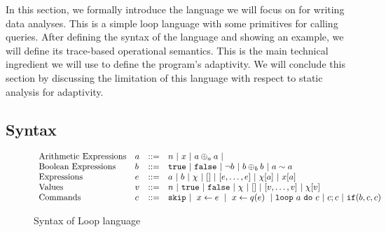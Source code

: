 In this section, we formally introduce the language we will focus on for writing data analyses.  This is a simple loop language with some primitives for calling queries. After defining the syntax of the language and showing an example, we will define its trace-based operational semantics. This is the main technical ingredient we will use to define the program's adaptivity. We will conclude this section by discussing the limitation of this language with respect to static analysis for adaptivity.

\subsection{Syntax}
\label{subsec:loop-syntax}
{\small
\begin{figure}
\[
\begin{array}{llll}
\mbox{Arithmetic Expressions} & \aexpr & ::= & 
	n ~|~ x ~|~ \aexpr \oplus_a \aexpr ~|~ \\
\mbox{Boolean Expressions} & \bexpr & ::= & 
	\etrue ~|~ \efalse  ~|~ \neg \bexpr
	 ~|~ \bexpr \oplus_b \bexpr
	~|~ \aexpr \sim \aexpr \\
\mbox{Expressions } & \expr & ::= & \aexpr \sep \bexpr \sep \chi\sep [] ~|~ [\expr, \dots, \expr] ~|~ \chi[\aexpr] ~|~ x[\aexpr]\\
\mbox{Values } & v & ::= & n \sep \etrue \sep \efalse \sep \chi \sep [] ~|~ [v, \dots, v] ~|~ \chi[v] \\
\mbox{Commands} & c & ::= &  \eskip  ~|~  \assign x \expr ~|~  \assign{x}{ q(e)}
%
~|~ \eloop ~ \aexpr  ~ \edo ~ c  ~|~ c;c  ~|~ \eif(\bexpr, c, c) 	 
	\\
%
\end{array}
\]
    \vspace{-0.3cm}
 \caption{Syntax of Loop language}
    \label{fig:syntax_highlevel}
    \vspace{-0.5cm}
\end{figure}
}
